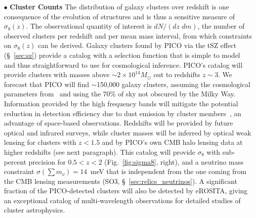 \documentclass[PICOReport.tex]{subfiles}
\begin{document}
\noindent$\bullet$ {\bf Cluster Counts} \hspace{0.1in} \label{clusters}  
The distribution of galaxy clusters over redshift is one consequence of the evolution of structures and is thus a sensitive measure of $\sigma_{8}(z)$. The observational quantity of interest is $dN/(dz \,\, d m) $, the number of observed clusters per redshift and per mean mass interval, from which constraints on $\sigma_{8}(z)$ can be derived. Galaxy clusters found by PICO via the \ac{tSZ} effect (\S~\ref{sec:sz}) provide a catalog with a selection function that is simple to model and thus straightforward to use for cosmological inference. PICO's catalog will provide clusters with masses above $\sim2\times10^{14} M_\odot$ out to redshifts $z\sim3$. We forecast that PICO will find $\sim$150,000 galaxy clusters, assuming the cosmological parameters from \planck\  and using the 70\% of sky not obscured by the Milky Way.  Information provided by the high frequency bands will mitigate the potential reduction in detection efficiency due to dust emission by cluster members~\citep{melin_2018}, an advantage of space-based observations. Redshifts will be provided by future optical and infrared surveys, while cluster masses will be inferred by optical weak lensing for clusters with $z < 1.5$ and by PICO's own CMB halo lensing data at higher redshifts (see next paragraph).  This catalog will provide $\sigma_{8}$ with sub-percent precision for $0.5 < z < 2$ (Fig.~\ref{fig:sigma8}, right), and a neutrino mass constraint $\sigma(\sum m_{\nu}) = 14$~meV that is independent from the one coming from the CMB lensing measurements (SO3, \S~\ref{sec:relics_neutrinos}). A significant fraction of the PICO-detected clusters will also be detected by eROSITA, giving an exceptional catalog of multi-wavelength observations for detailed studies of cluster astrophysics. 
\end{document}
